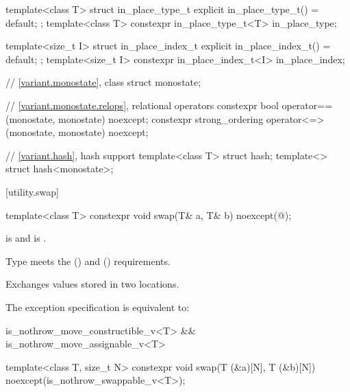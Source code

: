 \begin{codeblock}
{  template<class T>
    struct in_place_type_t {
      explicit in_place_type_t() = default;
    };
  template<class T> constexpr in_place_type_t<T> in_place_type{};

  template<size_t I>
    struct in_place_index_t {
      explicit in_place_index_t() = default;
    };
  template<size_t I> constexpr in_place_index_t<I> in_place_index{};

  // \ref{variant.monostate}, class %
  struct monostate;

  // \ref{variant.monostate.relops},  relational operators%
%
  constexpr bool operator==(monostate, monostate) noexcept;
  constexpr strong_ordering operator<=>(monostate, monostate) noexcept;

  // \ref{variant.hash}, hash support%
  template<class T> struct hash;
  template<> struct hash<monostate>;
}
\end{codeblock}

[utility.swap]{}

%
\begin{itemdecl}
template<class T>
  constexpr void swap(T& a, T& b) noexcept(@\seebelow@);
\end{itemdecl}

\begin{itemdescr}
\pnum
\constraints
{} is  and
 is .

\pnum
\expects
Type
meets the
 ()
and
 ()
requirements.

\pnum
\effects
Exchanges values stored in two locations.

\pnum
\remarks
The exception specification is equivalent to:

\begin{codeblock}
is_nothrow_move_constructible_v<T> && is_nothrow_move_assignable_v<T>
\end{codeblock}
\end{itemdescr}

%
\begin{itemdecl}
template<class T, size_t N>
  constexpr void swap(T (&a)[N], T (&b)[N]) noexcept(is_nothrow_swappable_v<T>);
\end{itemdecl}


